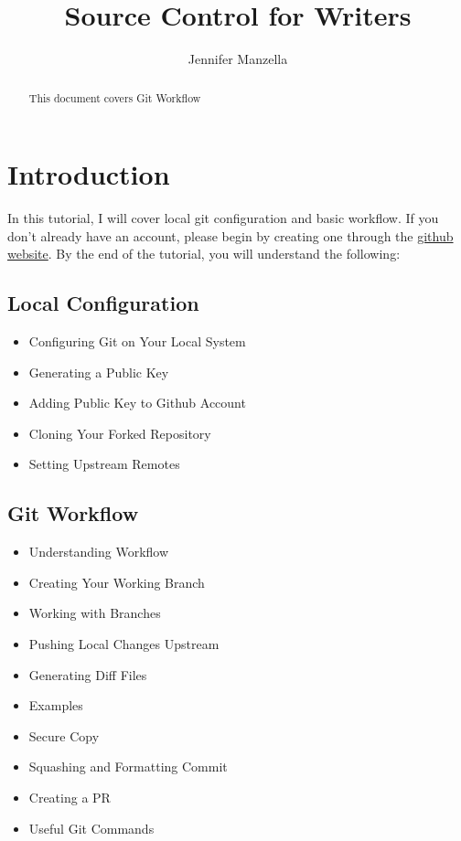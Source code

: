 \documentclass{article}
\title{Source Control for Writers}
\author{Jennifer Manzella}
\begin{document}
\maketitle

\begin{abstract}
This document covers Git Workflow
\end{abstract}

\section{Introduction}
    In this tutorial, I will cover local git configuration and basic workflow.
	If you don't already have an account, please begin by creating one through
	the  \href{https://www.github.com}{github website}. By the end of the
	tutorial, you will understand the following:
    \subsection{Local Configuration}
    \begin{itemize}
        \item Configuring Git on Your Local System
        \item Generating a Public Key
        \item Adding Public Key to Github Account
        \item Cloning Your Forked Repository
        \item Setting Upstream Remotes
        \end{itemize}
    \subsection{Git Workflow}
    \begin{itemize}
        \item Understanding Workflow
        \item Creating Your Working Branch
        \item Working with Branches
        \item Pushing Local Changes Upstream
        \item Generating Diff Files
        \item Examples
        \item Secure Copy
        \item Squashing and Formatting Commit
        \item Creating a PR
        \item Useful Git Commands
    \end{itemize}
\end{document}
